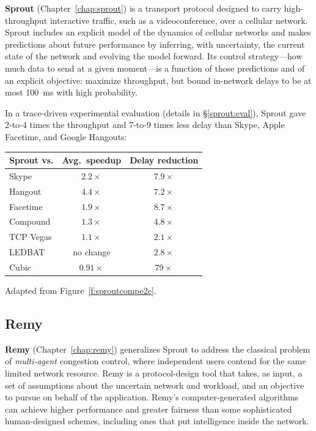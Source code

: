 \textbf{Sprout} (Chapter~\ref{chap:sprout}) is a transport protocol
designed to carry high-throughput interactive traffic, such as a
videoconference, over a cellular network. Sprout includes an explicit
model of the dynamics of cellular networks and makes predictions about
future performance by inferring, with uncertainty, the current state
of the network and evolving the model forward. Its control
strategy---how much data to send at a given moment---is a function of
those predictions and of an explicit objective: maximize throughput,
but bound in-network delays to be at most 100~ms with high
probability.

In a trace-driven experimental evaluation (details in
\S\ref{sprout:eval}), Sprout gave 2-to-4 times the throughput and
7-to-9 times less delay than Skype, Apple Facetime, and Google
Hangouts:

\begin{center}
\noindent \begin{tabular}{|l|c|c|}
\hline
Sprout vs. & Avg.~speedup & Delay reduction \\
\hline
\hline
Skype & $2.2\times$ & $7.9\times$\\
Hangout & $4.4\times$ & $7.2\times$\\
Facetime & $1.9\times$ & $8.7\times$\\
\hline
Compound & $1.3\times$ & $4.8\times$\\
TCP Vegas & $1.1\times$ & $2.1\times$\\
LEDBAT & no change & $2.8\times$\\
Cubic & \cellcolor{red!20}$0.91\times$ & $79\times$\\
\hline
\end{tabular}

{\footnotesize Adapted from Figure~\ref{f:sproutcompe2e}.}

\end{center}

\subsection{Remy}

\textbf{Remy} (Chapter~\ref{chap:remy}) generalizes Sprout to address
the classical problem of \emph{multi-agent} congestion control, where
independent users contend for the same limited network resource. Remy
is a protocol-design tool that takes, as input, a set of assumptions
about the uncertain network and workload, and an objective to pursue
on behalf of the application. Remy's computer-generated algorithms can
achieve higher performance and greater fairness than some
sophisticated human-designed schemes, including ones that put
intelligence inside the network.

